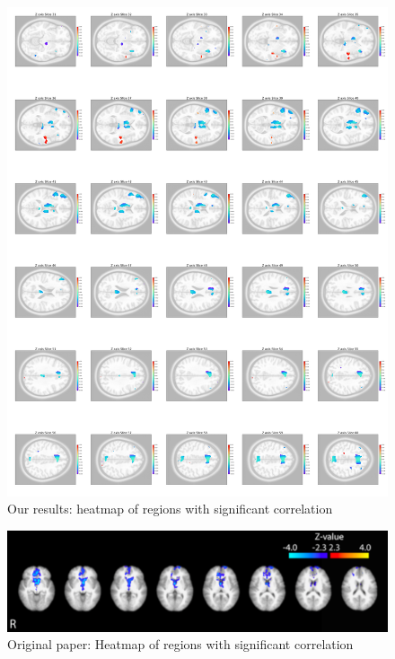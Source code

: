 \documentclass[11pt]{article}
\begin{document}
\begin{figure}[H]
    \centering
        \includegraphics[scale=0.1]{figures/Regression3/sig_cor_z_loss.png}
    \caption{Our results: heatmap of regions with significant correlation}
\end{figure}

\begin{figure}[H]
    \centering
        \includegraphics[scale=0.5]{figures/Regression3/Orig_sig_cor_z_loss.png}
    \caption{Original paper: Heatmap of regions with significant correlation}
\end{figure}

\newpage
\end{document}

